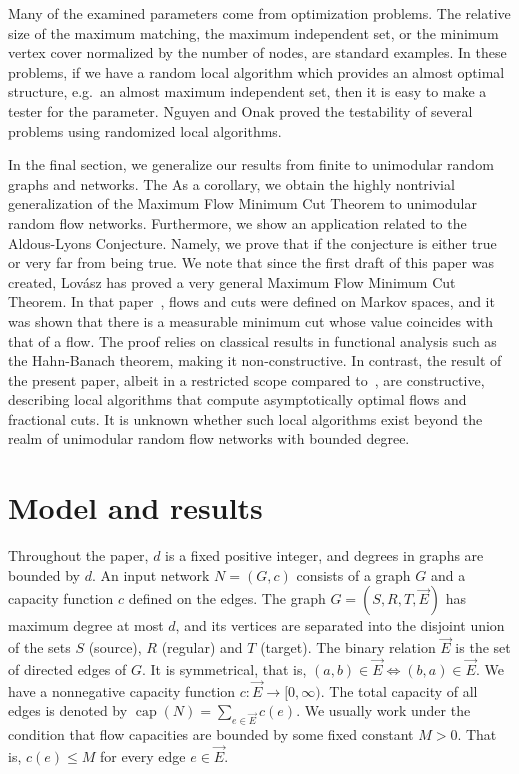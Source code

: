 \documentclass[12pt,a4paper]{article}
\newcommand{\capp}{\operatorname{cap}}
\newcommand{\vE}{\vec{E}}
\renewcommand{\:}{\colon}
\begin{document}
Many of the examined parameters come from optimization problems. 
The relative size of the maximum matching, the maximum independent set, or the minimum vertex cover normalized by the number of nodes, are standard examples. 
In these problems, if we have a random local algorithm which provides an almost optimal structure, e.g.\ an almost maximum independent set, then it is easy to make a tester for the parameter. 
Nguyen and Onak \cite{NgOn} proved the testability of several problems using randomized local algorithms.



In the final section, we generalize our results from finite to unimodular random graphs and networks. 
The 
As a corollary, we obtain the highly nontrivial generalization of the Maximum Flow Minimum Cut Theorem to unimodular random flow networks. 
Furthermore, we show an application related to the Aldous-Lyons Conjecture. 
Namely, we prove that if the conjecture is either true or very far from being true. 
We note that since the first draft of this paper was created, Lovász has proved a very general Maximum Flow Minimum Cut Theorem. 
In that paper~\cite{Lovaszmeasure}, flows and cuts were defined on Markov spaces, and it was shown that there is a measurable minimum cut whose value coincides with that of a flow. 
The proof relies on classical results in functional analysis such as the Hahn-Banach theorem, making it non-constructive. 
In contrast, the result of the present paper, albeit in a restricted scope compared to~\cite{Lovaszmeasure}, are constructive, describing local algorithms that compute asymptotically optimal flows and fractional cuts. 
It is unknown whether such local algorithms exist beyond the realm of unimodular random flow networks with bounded degree. 


\section{Model and results}

Throughout the paper, $d$ is a fixed positive integer, and degrees in graphs are bounded by $d$. 
An input network $N = (G, c)$ consists of a graph $G$ and a capacity function $c$ defined on the edges. 
The graph $G = (S, R, T, \vE)$ has maximum degree at most $d$, and its vertices are separated into the disjoint union of the sets $S$ (source), $R$ (regular) and $T$ (target). The binary relation $\vE$ is the set of directed edges of $G$. 
It is symmetrical, that is, $(a, b) \in \vE \Leftrightarrow (b, a) \in \vE$. 
We have a nonnegative capacity function $c \: \vE \rightarrow [0, \infty)$. 
The total capacity of all edges is denoted by $\capp(N) = \sum\limits_{e \in \vE} c(e)$. 
We usually work under the condition that flow capacities are bounded by some fixed constant $M>0$. 
That is, $c(e)\leq M$ for every edge $e\in \vE$. 
\end{document}
